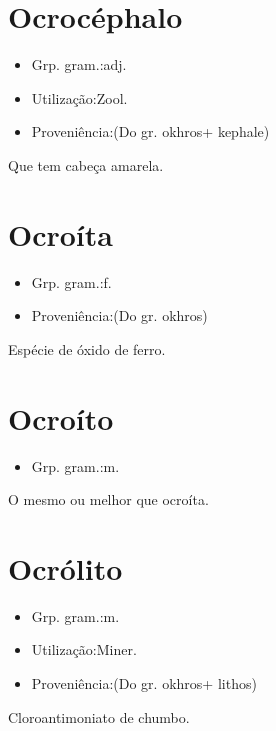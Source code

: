 \section{Ocrocéphalo}
\begin{itemize}
\item {Grp. gram.:adj.}
\end{itemize}
\begin{itemize}
\item {Utilização:Zool.}
\end{itemize}
\begin{itemize}
\item {Proveniência:(Do gr. \textunderscore okhros\textunderscore  + \textunderscore kephale\textunderscore )}
\end{itemize}
Que tem cabeça amarela.
\section{Ocroíta}
\begin{itemize}
\item {Grp. gram.:f.}
\end{itemize}
\begin{itemize}
\item {Proveniência:(Do gr. \textunderscore okhros\textunderscore )}
\end{itemize}
Espécie de óxido de ferro.
\section{Ocroíto}
\begin{itemize}
\item {Grp. gram.:m.}
\end{itemize}
O mesmo ou melhor que \textunderscore ocroíta\textunderscore .
\section{Ocrólito}
\begin{itemize}
\item {Grp. gram.:m.}
\end{itemize}
\begin{itemize}
\item {Utilização:Miner.}
\end{itemize}
\begin{itemize}
\item {Proveniência:(Do gr. \textunderscore okhros\textunderscore  + \textunderscore lithos\textunderscore )}
\end{itemize}
Cloroantimoniato de chumbo.

